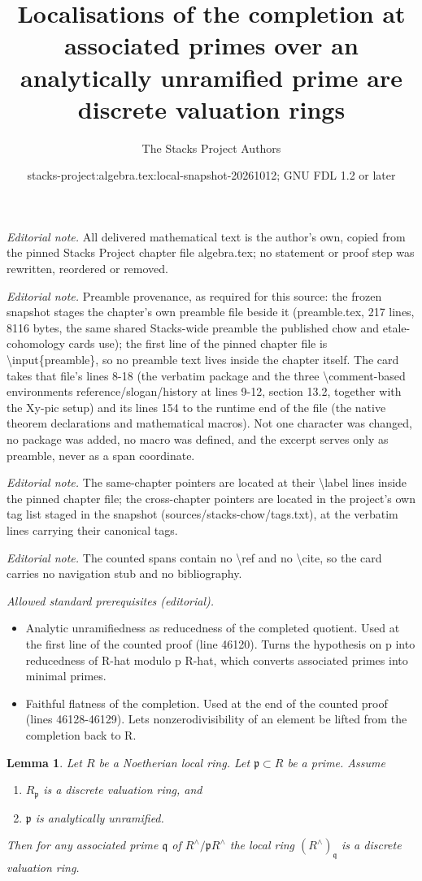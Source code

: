 \documentclass[10pt,a4paper]{amsart}
\title{Localisations of the completion at associated primes over an analytically unramified prime are discrete valuation rings}
\author{The Stacks Project Authors}
\date{stacks-project:algebra.tex:local-snapshot-20261012; GNU FDL 1.2 or later}
\theoremstyle{plain}
\newtheorem{lemma}[subsection]{Lemma}
\theoremstyle{definition}
\theoremstyle{remark}
\numberwithin{equation}{subsection}
\begin{document}
\maketitle
\noindent\textit{Editorial note.} All delivered mathematical text is the author's own, copied from the pinned Stacks Project chapter file algebra.tex; no statement or proof step was rewritten, reordered or removed.\par\medskip
\noindent\textit{Editorial note.} Preamble provenance, as required for this source: the frozen snapshot stages the chapter's own preamble file beside it (preamble.tex, 217 lines, 8116 bytes, the same shared Stacks-wide preamble the published chow and etale-cohomology cards use); the first line of the pinned chapter file is \textbackslash{}input\{preamble\}, so no preamble text lives inside the chapter itself. The card takes that file's lines 8-18 (the verbatim package and the three \textbackslash{}comment-based environments reference/slogan/history at lines 9-12, section 13.2, together with the Xy-pic setup) and its lines 154 to the runtime end of the file (the native theorem declarations and mathematical macros). Not one character was changed, no package was added, no macro was defined, and the excerpt serves only as preamble, never as a span coordinate.\par\medskip
\noindent\textit{Editorial note.} The same-chapter pointers are located at their \textbackslash{}label lines inside the pinned chapter file; the cross-chapter pointers are located in the project's own tag list staged in the snapshot (sources/stacks-chow/tags.txt), at the verbatim lines carrying their canonical tags.\par\medskip
\noindent\textit{Editorial note.} The counted spans contain no \textbackslash{}ref and no \textbackslash{}cite, so the card carries no navigation stub and no bibliography.\par\medskip
\noindent\textit{Allowed standard prerequisites (editorial).}\begin{itemize}
\item Analytic unramifiedness as reducedness of the completed quotient. Used at the first line of the counted proof (line 46120). Turns the hypothesis on p into reducedness of R-hat modulo p R-hat, which converts associated primes into minimal primes.
\item Faithful flatness of the completion. Used at the end of the counted proof (lines 46128-46129). Lets nonzerodivisibility of an element be lifted from the completion back to R.
\end{itemize}\medskip
\begin{lemma}
\label{lemma-codimension-1-analytically-unramified}
Let $R$ be a Noetherian local ring.
Let $\mathfrak p \subset R$ be a prime.
Assume
\begin{enumerate}
\item $R_{\mathfrak p}$ is a discrete valuation ring, and
\item $\mathfrak p$ is analytically unramified.
\end{enumerate}
Then for any associated prime $\mathfrak q$ of $R^\wedge/\mathfrak pR^\wedge$
the local ring $(R^\wedge)_{\mathfrak q}$ is a discrete valuation ring.
\end{lemma}
\end{document}
